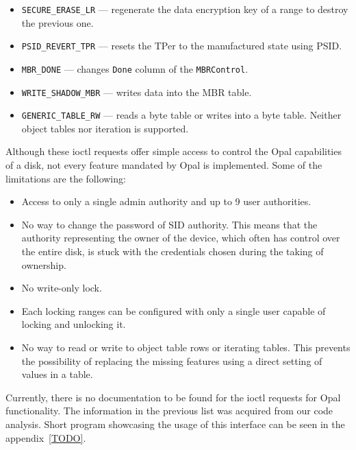 \begin{itemize}
\item \verb|SECURE_ERASE_LR| --- regenerate the data encryption key of a range to destroy the previous one.
\item \verb|PSID_REVERT_TPR| --- resets the TPer to the manufactured state using PSID.
\item \verb|MBR_DONE| --- changes \verb|Done| column of the \verb|MBRControl|. %
\item \verb|WRITE_SHADOW_MBR| --- writes data into the MBR table.
\item \verb|GENERIC_TABLE_RW| --- reads a byte table or writes into a byte table. Neither object tables nor iteration is supported.
\end{itemize}

Although these ioctl requests offer simple access to control the Opal capabilities of a disk, not every feature mandated by Opal is implemented. Some of the limitations are the following: 
\begin{itemize}
\item Access to only a single admin authority and up to 9 user authorities.
\item No way to change the password of SID authority. This means that the authority representing the owner of the device, which often has control over the entire disk, is stuck with the credentials chosen during the taking of ownership. 
\item No write-only lock.
\item Each locking ranges can be configured with only a single user capable of locking and unlocking it.
\item No way to read or write to object table rows or iterating tables. This prevents the possibility of replacing the missing features using a direct setting of values in a table.
\end{itemize}

Currently, there is no documentation to be found for the ioctl requests for Opal functionality. The information in the previous list was acquired from our code analysis.
Short program showcasing the usage of this interface can be seen in the appendix~\ref{TODO}.

